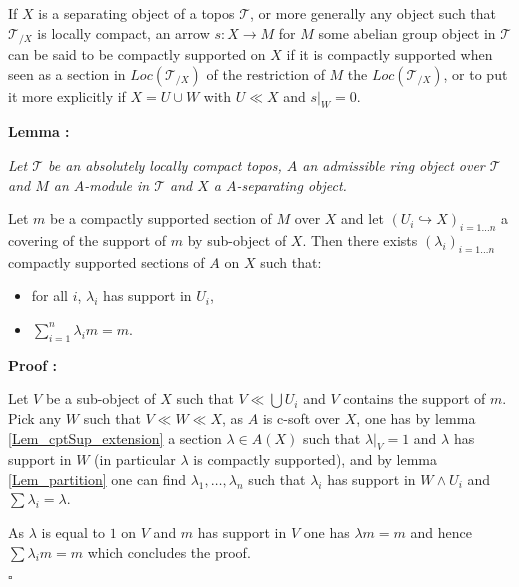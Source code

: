 \documentclass[a4paper]{article}
\newcommand{\Tcal}{\mathcal{T}}
\newcommand{\block}[1]
{

\par \subsubsection{} #1

\bigskip}
\newcommand{\Lem}[1]
	{

	\bigskip
	
	\textbf{Lemma : }{\itshape #1}
		
	\bigskip
	
	}
\newcommand{\Dem}[1]{
	
	\smallskip
	
	\textbf{Proof : } \par
	 {#1} $\square$
	 
	 \bigskip
}
\begin{document}
\block{\label{Lem_partition2} If $X$ is a separating object of a topos $\Tcal$, or more generally any object such that $\Tcal_{/X}$ is locally compact, an arrow $s:X \rightarrow M$ for $M$ some abelian group object in $\Tcal$ can be said to be compactly supported on $X$ if it is compactly supported when seen as a section in $Loc(\Tcal_{/X})$ of the restriction of $M$ the $Loc(\Tcal_{/X})$, or to put it more explicitly if $X=U \cup W$ with $U \ll X$ and $s|_W=0$.


\Lem{Let $\Tcal$ be an absolutely locally compact topos, $A$ an admissible ring object over $\Tcal$ and $M$ an $A$-module in $\Tcal$ and $X$ a $A$-separating object.

Let $m$ be a compactly supported section of $M$ over $X$ and let $(U_i \hookrightarrow X)_{i=1 \dots n}$ a covering of the support of $m$ by sub-object of $X$. Then there exists $(\lambda_i)_{i=1 \dots n}$ compactly supported sections of $A$ on $X$ such that:

\begin{itemize}

\item for all $i$, $\lambda_i$ has support in $U_i$,

\item $\displaystyle \sum_{i=1}^n \lambda_i m =m. $

\end{itemize}

}
\Dem{Let $V$ be a sub-object of $X$ such that $V \ll \bigcup U_i$ and $V$ contains the support of $m$. Pick any $W$ such that $V \ll W \ll X$, as $A$ is c-soft over $X$, one has by lemma \ref{Lem_cptSup_extension} a section $\lambda \in A(X)$ such that $\lambda|_V=1$ and $\lambda$ has support in $W$ (in particular $\lambda$ is compactly supported),
and by lemma \ref{Lem_partition} one can find $\lambda_1,\dots,\lambda_n$ such that $\lambda_i$ has support in $W \wedge U_i$ and $\sum \lambda_i = \lambda$.

As $\lambda$ is equal to $1$ on $V$ and $m$ has support in $V$ one has $\lambda m =m$ and hence $\sum \lambda_i m = m$ which concludes the proof. 
}
}
\end{document}
